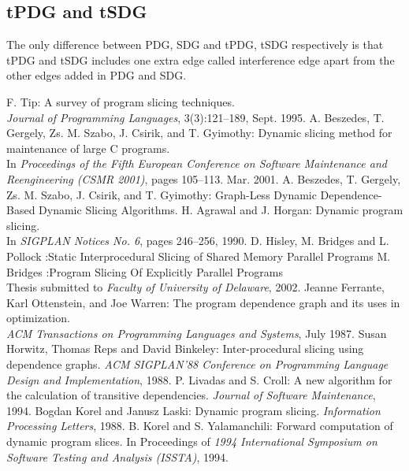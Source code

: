 \documentclass[conference]{IEEEtran}
\begin{document}
\subsection{tPDG and tSDG}
\par The only difference between PDG, SDG and tPDG, tSDG respectively is that tPDG and tSDG includes one extra edge called interference edge apart from the other edges added in PDG and SDG. 
\begin{thebibliography}{00}
F. Tip: A survey of program slicing techniques.\\
\emph{Journal of Programming Languages}, 3(3):121–189, Sept. 1995.
A. Beszedes, T. Gergely, Zs. M. Szabo, J. Csirik, and
T. Gyimothy: Dynamic slicing method for maintenance of
large C programs.\\
In\emph{ Proceedings of the Fifth European
Conference on Software Maintenance and Reengineering
(CSMR 2001)}, pages 105–113. Mar. 2001.
A. Beszedes, T. Gergely, Zs. M. Szabo, J. Csirik, and
T. Gyimothy: Graph-Less Dynamic Dependence-Based Dynamic Slicing Algorithms.
H. Agrawal and J. Horgan: Dynamic program slicing.\\
In \emph{SIGPLAN Notices No. 6}, pages 246–256, 1990.
D. Hisley, M. Bridges and L. Pollock :Static Interprocedural Slicing of Shared Memory Parallel Programs
 M. Bridges :Program Slicing Of Explicitly Parallel Programs\\
Thesis submitted to \emph{Faculty of University of Delaware}, 2002. 
Jeanne Ferrante, Karl Ottenstein, and Joe Warren: The program dependence graph and its uses in optimization.\\
\emph{ACM Transactions on Programming Languages and Systems}, July 1987.
Susan Horwitz, Thomas Reps and David Binkeley: Inter-procedural slicing using dependence graphs. 
\emph{ACM SIGPLAN'88 Conference on Programming Language Design and Implementation}, 1988.
P. Livadas and S. Croll: A new algorithm for the calculation of transitive dependencies.
\emph{Journal of Software Maintenance}, 1994.
Bogdan Korel and Janusz Laski: Dynamic program slicing. 
\emph{Information Processing Letters}, 1988.
B. Korel and S. Yalamanchili: Forward computation of dynamic program slices. 
In Proceedings of \emph{1994 International Symposium on Software Testing and Analysis (ISSTA)}, 1994.

\end{thebibliography}


 
\end{document}
